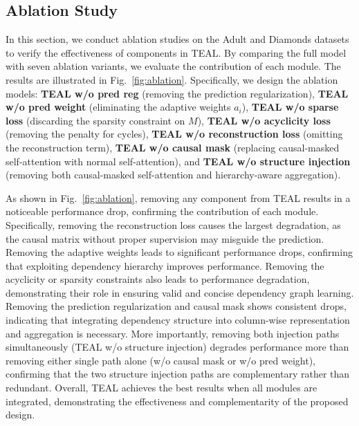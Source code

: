 \documentclass[conference]{IEEEtran}
\newcommand{\rln}[1]{{\color{black}#1}}
\newcommand{\rlx}[1]{\color{black}#1}
\newcommand{\vldb}[1]{{\color{black}#1}}
\newcommand{\syic}[1]{{\color{black}#1}}
\newcommand*{\ourmodel}{TEAL}
\begin{document}
\subsection{Ablation Study}
\vldb{In this section, we conduct ablation studies on the Adult and Diamonds datasets to verify the effectiveness of components in \ourmodel{}. By comparing the full model with seven ablation variants, we evaluate the contribution of each module. The results are illustrated in Fig.~\ref{fig:ablation}. Specifically, we design the ablation models: \textbf{\ourmodel{} w/o pred reg} (removing the prediction regularization), \textbf{\ourmodel{} w/o pred weight} (eliminating the adaptive weights $a_i$), \textbf{\ourmodel{} w/o sparse loss} (discarding the sparsity constraint on $M$), \textbf{\ourmodel{} w/o acyclicity loss} (removing the penalty for cycles), \textbf{\ourmodel{} w/o reconstruction loss} (omitting the reconstruction term), \textbf{\ourmodel{} w/o causal mask} (replacing causal-masked self-attention with normal self-attention), \syic{and \textbf{\ourmodel{} w/o structure injection} (removing both causal-masked self-attention and hierarchy-aware aggregation).}
}

\rln{
As shown in Fig.~\ref{fig:ablation}, removing any component from \ourmodel{} results in a noticeable performance drop, confirming the contribution of each module. 
\rlx{Specifically, removing the reconstruction loss causes the largest degradation, as the causal matrix without proper supervision may misguide the prediction. 
Removing the adaptive weights leads to significant performance drops, confirming that exploiting \syic{dependency} hierarchy improves performance. }}
Removing the acyclicity or sparsity constraints also leads to performance degradation, demonstrating their role in ensuring valid and concise \syic{dependency} graph learning. Removing the prediction regularization and causal mask shows consistent drops, indicating that integrating \syic{dependency} structure into column-wise representation and aggregation is necessary. \syic{More importantly, removing both injection paths simultaneously (\ourmodel{} w/o structure injection) degrades performance more than removing either single path alone (w/o causal mask or w/o pred weight), confirming that the two structure injection paths are complementary rather than redundant.}
Overall, \ourmodel{} achieves the best results when all modules are integrated, demonstrating the effectiveness and complementarity of the proposed design.
\end{document}
